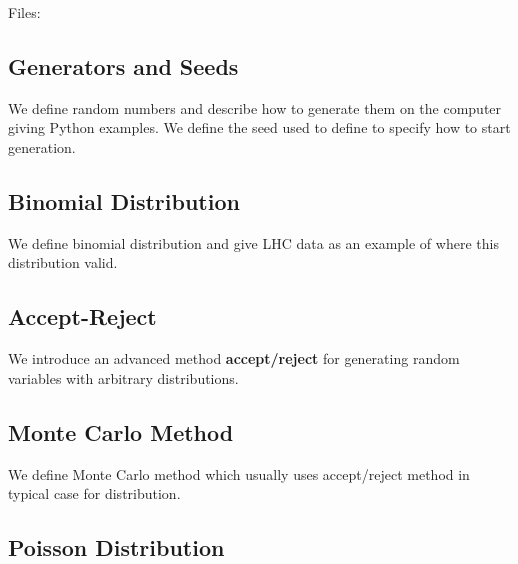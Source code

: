 Files:


\subsection{Generators and Seeds}\label{generators-and-seeds}

We define random numbers and describe how to generate them on the
computer giving Python examples. We define the seed used to define to
specify how to start generation.



\subsection{Binomial Distribution}\label{binomial-distribution}

We define binomial distribution and give LHC data as an example of where
this distribution valid.


\subsection{Accept-Reject}\label{accept-reject}

We introduce an advanced method \textbf{accept/reject} for generating
random variables with arbitrary distributions.


\subsection{Monte Carlo Method}\label{monte-carlo-method}

We define Monte Carlo method which usually uses accept/reject method in
typical case for distribution.


\subsection{Poisson Distribution}\label{poisson-distribution}

